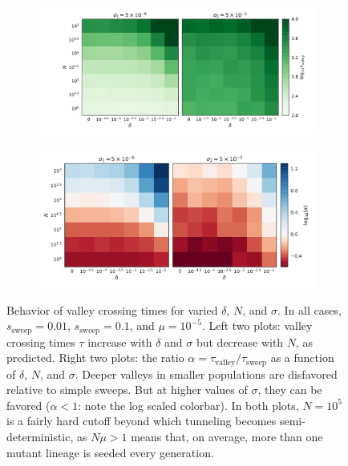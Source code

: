 \documentclass[rmp]{revtex4}
\begin{document}
\begin{spacing}{1.5}
\begin{figure}
\begin{subfigure}[b]{0.43\textwidth}
\includegraphics[width=\textwidth]{Figures/tau_compare.pdf}
\end{subfigure}
\begin{subfigure}[b]{0.4\textwidth}
\includegraphics[width=\textwidth]{Figures/alpha_ratios.pdf}
\end{subfigure}
\caption{Behavior of valley crossing times for varied $\delta$, $N$, and $\sigma$. In all cases, $s_{\mathrm{sweep}} = 0.01$, $s_{\mathrm{sweep}} = 0.1$, and $\mu = 10^{-5}$. Left two plots: valley crossing times $\tau$ increase with $\delta$ and $\sigma$ but decrease with $N$, as predicted. Right two plots: the ratio $\alpha = \tau_{\mathrm{valley}}/\tau_{\mathrm{sweep}}$ as a function of $\delta$, $N$, and $\sigma$. Deeper valleys in smaller populations are disfavored relative to simple sweeps. But at higher values of $\sigma$, they can be favored ($\alpha < 1$: note the log scaled colorbar). In both plots, $N = 10^5$ is a fairly hard cutoff beyond which tunneling becomes semi-deterministic, as $N\mu > 1$ means that, on average, more than one mutant lineage is seeded every generation.}
\label{fig:ratios}
\end{figure}


\end{spacing}
\end{document}
